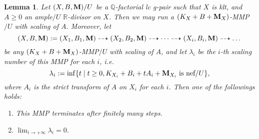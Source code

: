 \documentclass[11pt]{amsart}
\numberwithin{equation}{section}
\newcommand{\Mm}{{\bf{M}}}
\newcommand{\Qq}{\mathbb{Q}}
\newcommand{\Rr}{\mathbb{R}}
\newtheorem{lem}[thm]{Lemma}
\theoremstyle{definition}
\theoremstyle{definition}
\theoremstyle{definition}
\begin{document}
\begin{lem}\label{lem: scaling number go to 0}
Let $(X,B,\Mm)/U$ be a $\Qq$-factorial lc g-pair such that $X$ is klt, and $A\geq 0$ an ample$/U$ $\Rr$-divisor on $X$. Then we may run a $(K_X+B+\Mm_X)$-MMP$/U$ with scaling of $A$. Moreover, let $$(X,B,\Mm):=(X_1,B_1,\Mm)\dashrightarrow (X_2,B_2,\Mm)\dashrightarrow\dots\dashrightarrow (X_i,B_i,\Mm)\dashrightarrow\dots$$
be any $(K_X+B+\Mm_X)$-MMP$/U$ with scaling of $A$, and let $\lambda_i$ be the $i$-th scaling number of this MMP for each $i$, i.e.
$$\lambda_i:=\inf\{t\mid t\geq 0, K_{X_i}+B_i+tA_i+\Mm_{X_i}\text{ is nef/}U\},$$
where $A_i$ is the strict transform of $A$ on $X_i$ for each $i$. Then one of the followings holds:
\begin{enumerate}
    \item This MMP terminates after finitely many steps.
    \item $\lim_{i\rightarrow +\infty}\lambda_i=0$.
\end{enumerate}
\end{lem}
\end{document}
